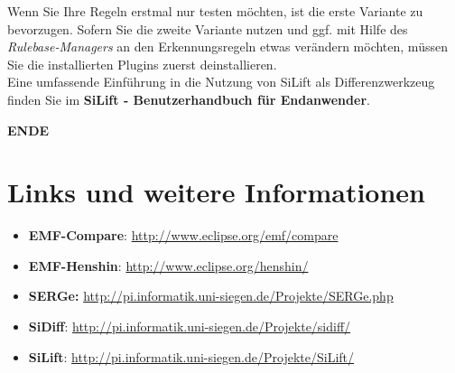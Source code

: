 \documentclass[a4paper]{scrartcl}
\begin{document}
\begin{enumerate}




\end{enumerate}

Wenn Sie Ihre Regeln erstmal nur testen möchten, ist die erste Variante zu bevorzugen. 
Sofern Sie die zweite Variante nutzen und ggf. mit Hilfe des \textit{Rulebase-Managers} an den Erkennungsregeln  etwas verändern möchten, müssen Sie die installierten Plugins zuerst deinstallieren.\\
Eine umfassende Einführung in die Nutzung von SiLift als Differenzwerkzeug finden Sie im \textbf{SiLift - Benutzerhandbuch für Endanwender}.


\begin{center}
\textbf{ENDE}
\end{center}

\newpage

\section{Links und weitere Informationen}

\begin{itemize}
\item \textbf{EMF-Compare}: \url{http://www.eclipse.org/emf/compare}
\item \textbf{EMF-Henshin}: \url{http://www.eclipse.org/henshin/}
\item \textbf{SERGe:} \url{http://pi.informatik.uni-siegen.de/Projekte/SERGe.php}
\item \textbf{SiDiff}: \url{http://pi.informatik.uni-siegen.de/Projekte/sidiff/}
\item \textbf{SiLift}: \url{http://pi.informatik.uni-siegen.de/Projekte/SiLift/}
\end{itemize} 
\end{document}
